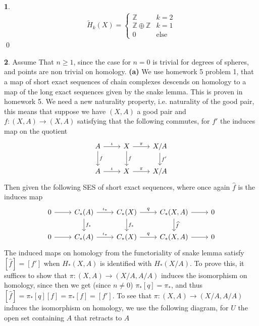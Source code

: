 \documentclass[10.5pt]{article}
\theoremstyle{definition}
\newtheorem{pb}{}
\begin{document}
\begin{pb}
        \begin{align*}
            \tilde{H}_k(X) = \begin{cases}
                \mathbb{Z} & k = 2 \\ \mathbb{Z} \oplus \mathbb{Z} & k = 1 \\ 0 & \text{else}
            \end{cases}
        \end{align*}
        \qed
    \end{pb}
    \begin{pb}Assume That \(n \geq 1\), since the case for \(n = 0\) is trivial for degrees of spheres, and points are non trivial on homology.
        \textbf{(a)} We use homework 5 problem 1, that a map of short exact sequences of chain complexes descends on homology to a map of the long exact sequences given by the snake lemma. This is proven in homework 5. We need a new naturality property, i.e. naturality of the good pair, this means that suppose we have \((X,A)\) a good pair and \(f: (X,A) \to (X,A)\) satisfying that the following commutes, for \(f'\) the induces map on the quotient
        \begin{equation*}
            \begin{tikzcd}
                A \arrow[d,"f"] \arrow[r,"\iota"] &X \arrow[d,"f"] \arrow[r,"\pi"] &X/A \arrow[d,"f'"] \\
                A \arrow[r,"\iota"] &X \arrow[r,"\pi"] &X/A
            \end{tikzcd}
        \end{equation*}
        Then given the following SES of short exact sequences, where once again \(\hat{f}\) is the induces map
        \begin{equation*}
            \begin{tikzcd}
                0 \arrow[r,""] &C_*(A) \arrow[d,"f_*"] \arrow[r,"\iota_*"] &C_*(X) \arrow[d,"f_*"] \arrow[r,"q"] &C_*(X,A) \arrow[d,"\widehat{f}"] \arrow[r,""] &0 \\
                0 \arrow[r,""] &C_*(A) \arrow[r,"\iota_*"] &C_*(X) \arrow[r,"q"] &C_*(X,A) \arrow[r,""] &0
            \end{tikzcd}
        \end{equation*}
        The induced maps on homology from the functoriality of snake lemma satisfy \([\hat{f}] = [f']\) when \(H_*(X,A)\) is identified with \(H_*(X/A)\).
        To prove this, it suffices to show that \(\pi: (X,A) \to (X/A,A/A)\) induces the isomorphism on homology, since then we get (since \(n \neq 0\)) \(\pi_* [q] = \pi_*\), and thus \([\hat{f}] = \pi_*[q][f] = \pi_*[f] = [f']\). To see that \(\pi: (X,A) \to (X/A,A/A)\) induces the isomorphism on homology, we use the following diagram, for \(U\) the open set containing \(A\) that retracts to \(A\)

\end{pb}
\end{document}
